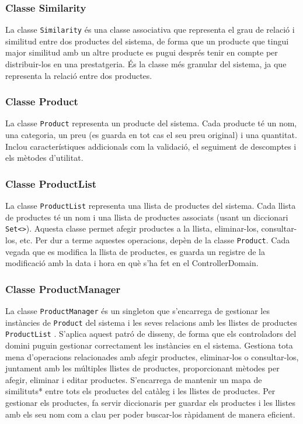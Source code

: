\documentclass[a4paper, t]{article}
\begin{document}
\subsubsection{Classe Similarity}
La classe \texttt{Similarity} és una classe associativa que representa el grau de relació i similitud entre dos productes del sistema, 
de forma que un producte que tingui major similitud amb un altre producte es pugui després tenir en compte per distribuir-los en una prestatgeria. 
És la classe més granular del sistema, ja que representa la relació entre dos productes.

\subsubsection{Classe Product}
La classe \texttt{Product} representa un producte del sistema. Cada producte té un nom, una categoria, un preu (es guarda en tot cas el seu preu original) i una quantitat.
Inclou característiques addicionals com la validació, el seguiment de descomptes i els mètodes d'utilitat.

\subsubsection{Classe ProductList}
La classe \texttt{ProductList} representa una llista de productes del sistema. Cada llista de productes té un nom i una llista de productes associats (usant un diccionari \texttt{Set\textless \textgreater}). 
Aquesta classe permet afegir productes a la llista, eliminar-los, consultar-los, etc. Per dur a terme aquestes operacions, depèn de la classe \texttt{Product}. Cada vegada que es modifica la llista de productes, es guarda un registre de la modificació amb la data i hora en què s’ha fet en el ControllerDomain.

\subsubsection{Classe ProductManager}
La classe \texttt{ProductManager} és un singleton que s’encarrega de gestionar les instàncies de \texttt{Product} del sistema i les seves relacions amb les llistes de productes \texttt{ProductList} .  
S’aplica aquest patró de disseny, de forma que els controladors del domini puguin gestionar correctament les instàncies en el sistema. Gestiona tota mena d’operacions relacionades amb afegir productes,
eliminar-los o consultar-los, juntament amb les múltiples llistes de productes, proporcionant mètodes per afegir, eliminar i editar productes. 
S’encarrega de mantenir un mapa de similituts* entre tots els productes del catàleg i les llistes de productes.  
Per gestionar els productes, fa servir diccionaris per guardar els productes i les llistes amb els seu nom com a clau per poder buscar-los ràpidament de manera eficient.
\end{document}
